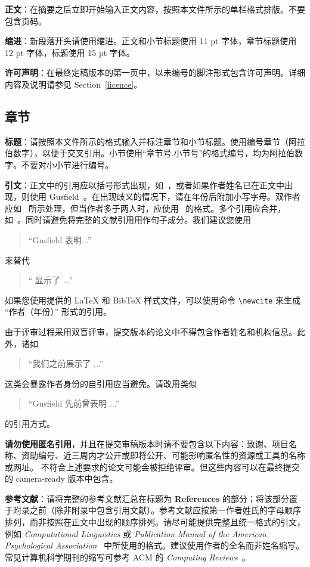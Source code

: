 \documentclass[11pt]{article}
\begin{document}
{\bf 正文}：在摘要之后立即开始输入正文内容，按照本文件所示的单栏格式排版。不要包含页码。

{\bf 缩进}：新段落开头请使用缩进。正文和小节标题使用 11 pt 字体，章节标题使用 12 pt 字体，标题使用 15 pt 字体。

{\bf 许可声明}：在最终定稿版本的第一页中，以未编号的脚注形式包含许可声明。详细内容及说明请参见 Section~\ref{licence}。
\subsection{章节}

{\bf 标题}：请按照本文件所示的格式输入并标注章节和小节标题。使用编号章节（阿拉伯数字），以便于交叉引用。小节使用“章节号.小节号”的格式编号，均为阿拉伯数字。不要对小小节进行编号。

{\bf 引文}：正文中的引用应以括号形式出现，如~\cite{Gusfield:97}，或者如果作者姓名已在正文中出现，则使用 Gusfield~。在出现歧义的情况下，请在年份后附加小写字母。双作者应如~\cite{Aho:72} 所示处理，但当作者多于两人时，应使用~\cite{Chandra:81} 的格式。多个引用应合并，如~\cite{Gusfield:97,Aho:72}。同时请避免将完整的文献引用用作句子成分。我们建议您使用
\begin{quote}
``Gusfield  表明...''
\end{quote}
来替代
\begin{quote}
  ``\cite{Gusfield:97} 显示了 ...''
\end{quote}

如果您使用提供的 \LaTeX{} 和 Bib\TeX{} 样式文件，可以使用命令 \verb|\newcite| 来生成 “作者（年份）” 形式的引用。

由于评审过程采用双盲评审，提交版本的论文中不得包含作者姓名和机构信息。此外，诸如
\begin{quote}
``我们之前展示了 \cite{Gusfield:97} ...''
\end{quote}
这类会暴露作者身份的自引用应当避免。请改用类似
\begin{quote}
``Gusfield  先前曾表明 ...''
\end{quote}
的引用方式。

\textbf{请勿使用匿名引用}，并且在提交审稿版本时请不要包含以下内容：致谢、项目名称、资助编号、近三周内才公开或即将公开、可能影响匿名性的资源或工具的名称或网址。
不符合上述要求的论文可能会被拒绝评审。但这些内容可以在最终提交的 camera-ready 版本中包含。

\textbf{参考文献}：请将完整的参考文献汇总在标题为 {\bf References} 的部分；将该部分置于附录之前（除非附录中包含引用文献）。参考文献应按第一作者姓氏的字母顺序排列，而非按照在正文中出现的顺序排列。请尽可能提供完整且统一格式的引文，例如 {\em Computational Linguistics\/} 或 {\em Publication Manual of the American Psychological Association\/}~\cite{APA:83} 中所使用的格式。建议使用作者的全名而非姓名缩写。常见计算机科学期刊的缩写可参考 ACM 的 {\em Computing Reviews\/}~\cite{ACM:83}。
\end{document}
